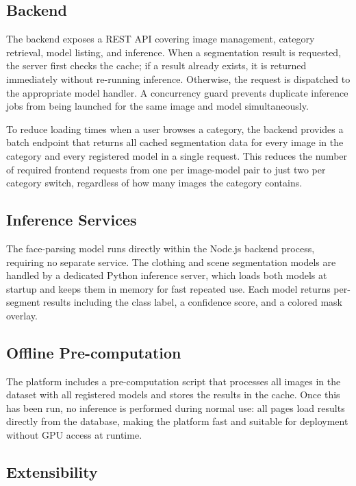 \documentclass[conference,a4paper,flushend]{iaria}
\begin{document}
\subsection{Backend}

The backend exposes a REST API covering image management, category retrieval, model listing, and inference. When a segmentation result is requested, the server first checks the cache; if a result already exists, it is returned immediately without re-running inference. Otherwise, the request is dispatched to the appropriate model handler. A concurrency guard prevents duplicate inference jobs from being launched for the same image and model simultaneously.

To reduce loading times when a user browses a category, the backend provides a batch endpoint that returns all cached segmentation data for every image in the category and every registered model in a single request. This reduces the number of required frontend requests from one per image-model pair to just two per category switch, regardless of how many images the category contains.

\subsection{Inference Services}

The face-parsing model runs directly within the Node.js backend process, requiring no separate service. The clothing and scene segmentation models are handled by a dedicated Python inference server, which loads both models at startup and keeps them in memory for fast repeated use. Each model returns per-segment results including the class label, a confidence score, and a colored mask overlay.

\subsection{Offline Pre-computation}

The platform includes a pre-computation script that processes all images in the dataset with all registered models and stores the results in the cache. Once this has been run, no inference is performed during normal use: all pages load results directly from the database, making the platform fast and suitable for deployment without GPU access at runtime.

\subsection{Extensibility}
\end{document}
